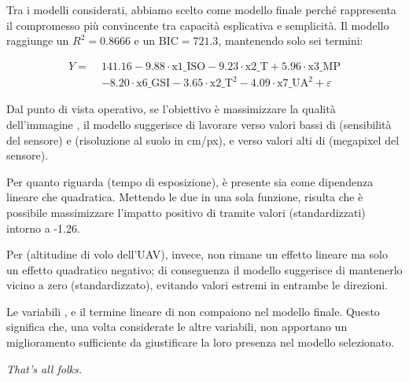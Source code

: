 Tra i modelli considerati, abbiamo scelto \texttt{} come modello finale perché rappresenta il compromesso più convincente tra capacità esplicativa e semplicità. Il modello raggiunge un $R^2 = 0.8666$ e un $\text{BIC} = 721.3$, mantenendo solo sei termini:

\[
\begin{aligned}
Y =\;& 141.16 - 9.88 \cdot \text{x1\_ISO}
       - 9.23 \cdot \text{x2\_T}
       + 5.96 \cdot \text{x3\_MP}\\
     & - 8.20 \cdot \text{x6\_GSI}
       - 3.65 \cdot \text{x2\_T}^2
       - 4.09 \cdot \text{x7\_UA}^2 + \varepsilon
\end{aligned}
\]

Dal punto di vista operativo, se l'obiettivo è massimizzare la qualità dell'immagine \texttt{}, il modello suggerisce di lavorare verso valori bassi di \texttt{} (sensibilità del sensore) e \texttt{} (risoluzione al suolo in cm/px), e verso valori alti di \texttt{} (megapixel del sensore).

Per quanto riguarda \texttt{} (tempo di esposizione), è presente sia come dipendenza lineare che quadratica. Mettendo le due in una sola funzione, risulta che è possibile massimizzare l'impatto positivo di \texttt{} tramite valori (standardizzati) intorno a -1.26.

Per \texttt{} (altitudine di volo dell'UAV), invece, non rimane un effetto lineare ma solo un effetto quadratico negativo; di conseguenza il modello suggerisce di mantenerlo vicino a zero (standardizzato), evitando valori estremi in entrambe le direzioni.

Le variabili \texttt{}, \texttt{} e il termine lineare di \texttt{} non compaiono nel modello finale. Questo significa che, una volta considerate le altre variabili, non apportano un miglioramento sufficiente da giustificare la loro presenza nel modello selezionato.

\emph{That's all folks.}
